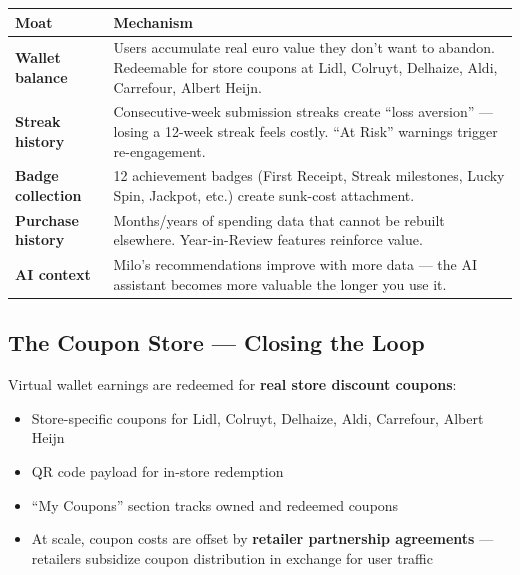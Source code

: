 \documentclass[11pt,a4paper]{article}
\begin{document}
\begin{center}
\renewcommand{\arraystretch}{1.3}
\begin{tabularx}{\textwidth}{L{3cm} L{10.5cm}}
\toprule
{}
\textbf{\color{white}Moat} & \textbf{\color{white}Mechanism} \\
\midrule
\textbf{Wallet balance} & Users accumulate real euro value they don't want to abandon. Redeemable for store coupons at Lidl, Colruyt, Delhaize, Aldi, Carrefour, Albert Heijn. \\
\textbf{Streak history} & Consecutive-week submission streaks create ``loss aversion'' --- losing a 12-week streak feels costly. ``At Risk'' warnings trigger re-engagement. \\
\textbf{Badge collection} & 12 achievement badges (First Receipt, Streak milestones, Lucky Spin, Jackpot, etc.) create sunk-cost attachment. \\
\textbf{Purchase history} & Months/years of spending data that cannot be rebuilt elsewhere. Year-in-Review features reinforce value. \\
\textbf{AI context} & Milo's recommendations improve with more data --- the AI assistant becomes more valuable the longer you use it. \\
\bottomrule
\end{tabularx}
\end{center}

\subsection{The Coupon Store --- Closing the Loop}

Virtual wallet earnings are redeemed for \textbf{real store discount coupons}:

\begin{itemize}[leftmargin=1.5em, itemsep=3pt]
  \item Store-specific coupons for Lidl, Colruyt, Delhaize, Aldi, Carrefour, Albert Heijn
  \item QR code payload for in-store redemption
  \item ``My Coupons'' section tracks owned and redeemed coupons
  \item At scale, coupon costs are offset by \textbf{retailer partnership agreements} --- retailers subsidize coupon distribution in exchange for user traffic
\end{itemize}

\clearpage
\end{document}
